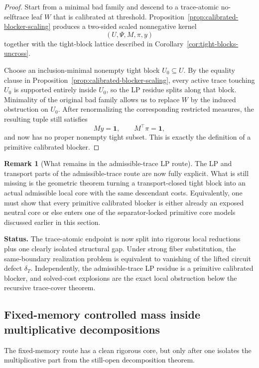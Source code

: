 \documentclass[11pt]{article}
\theoremstyle{definition}
\newtheorem{remark}[theorem]{Remark}
\newcommand{\1}{\mathbf{1}}
\newcommand{\status}[1]{\par\smallskip\noindent\textbf{Status.} #1\par\smallskip}
\begin{document}
\begin{proof}
Start from a minimal bad family and descend to a trace-atomic no-selftrace leaf $W$ that is calibrated at threshold. Proposition~\ref{prop:calibrated-blocker-scaling} produces a two-sided scaled nonnegative kernel
\[
(U,\Psi,M,\pi,y)
\]
together with the tight-block lattice described in Corollary~\ref{cor:tight-blocks-uncross}.

Choose an inclusion-minimal nonempty tight block $U_0\subseteq U$. By the equality clause in Proposition~\ref{prop:calibrated-blocker-scaling}, every active trace touching $U_0$ is supported entirely inside $U_0$, so the LP residue splits along that block. Minimality of the original bad family allows us to replace $W$ by the induced obstruction on $U_0$. After renormalizing the corresponding restricted measures, the resulting tuple still satisfies
\[
My=\mathbf 1,
\qquad
M^\top \pi=\mathbf 1,
\]
and now has no proper nonempty tight subset. This is exactly the definition of a primitive calibrated blocker.
\end{proof}

\begin{remark}[What remains in the admissible-trace LP route]\label{rem:primitive-blocker-gap}
The LP and transport parts of the admissible-trace route are now fully explicit. What is still missing is the geometric theorem turning a transport-closed tight block into an actual admissible local core with the same descendant costs. Equivalently, one must show that every primitive calibrated blocker is either already an exposed neutral core or else enters one of the separator-locked primitive core models discussed earlier in this section.
\end{remark}

\status{The trace-atomic endpoint is now split into rigorous local reductions plus one clearly isolated structural gap. Under strong fiber substitution, the same-boundary realization problem is equivalent to vanishing of the lifted circuit defect $\delta_T$. Independently, the admissible-trace LP residue is a primitive calibrated blocker, and solved-cost explosions are the exact local obstruction below the recursive trace-cover theorem.}


\subsection*{Fixed-memory controlled mass inside multiplicative decompositions}
The fixed-memory route has a clean rigorous core, but only after one isolates the multiplicative part from the still-open decomposition theorem.
\end{document}
